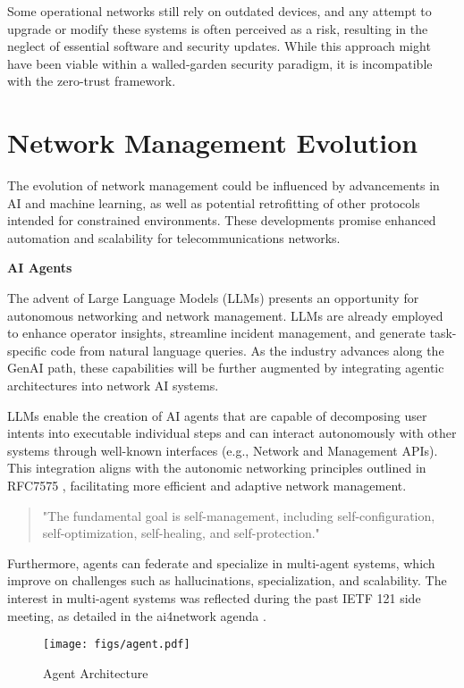 \documentclass[10pt,sigconf]{iabart}
\begin{document}
Some operational networks still rely on outdated devices, and any attempt to upgrade or modify these systems is often perceived as a risk, resulting in the neglect of essential software and security updates. While this approach might have been viable within a walled-garden security paradigm, it is incompatible with the zero-trust framework.

 
\section{Network Management Evolution} \label{insights}

The evolution of network management could be influenced by advancements in AI and machine learning, as well as potential retrofitting of other protocols intended for constrained environments. These developments promise enhanced automation and scalability for telecommunications networks.

\textbf{AI Agents}

The advent of Large Language Models (LLMs) presents an opportunity for autonomous networking and network management. LLMs are already employed to enhance operator insights, streamline incident management, and generate task-specific code from natural language queries. As the industry advances along the GenAI path, these capabilities will be further augmented by integrating agentic architectures into network AI systems.

LLMs enable the creation of AI agents that are capable of decomposing user intents into executable individual steps and can interact autonomously with other systems through well-known interfaces (e.g., Network and Management APIs). This integration aligns with the autonomic networking principles outlined in RFC7575 \cite{RFC7575}, facilitating more efficient and adaptive network management.

\begin{quote}
"The fundamental goal is self-management, including self-configuration, self-optimization, self-healing, and self-protection." 
\end{quote}

Furthermore, agents can federate and specialize in multi-agent systems, which improve on challenges such as hallucinations, specialization, and scalability. The interest in multi-agent systems was reflected during the past IETF 121 side meeting, as detailed in the ai4network agenda \cite{ai4network-agenda}. 

\begin{figure}[h]
  \centering
  \texttt{[image: figs/agent.pdf]}
  \caption{Agent Architecture}
  \label{fig:agent_architecture}
\end{figure}
\end{document}
